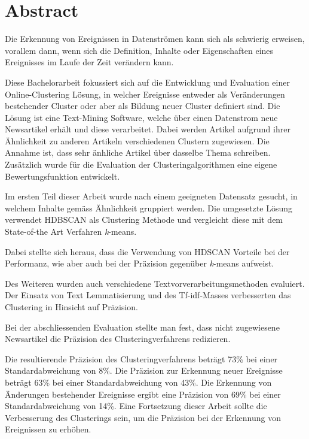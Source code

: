 
\section*{Abstract}

Die Erkennung von Ereignissen in Datenströmen kann sich als schwierig erweisen, vorallem dann,
wenn sich die Definition, Inhalte oder Eigenschaften eines Ereignisses im Laufe der Zeit verändern kann.

Diese Bachelorarbeit fokussiert sich auf die Entwicklung und Evaluation einer Online-Clustering Lösung,
in welcher Ereignisse entweder als Veränderungen bestehender Cluster oder aber als Bildung neuer Cluster
definiert sind.
Die Lösung ist eine Text-Mining Software, welche über einen Datenstrom neue Newsartikel erhält
und diese verarbeitet.
Dabei werden Artikel aufgrund ihrer Ähnlichkeit zu anderen Artikeln verschiedenen Clustern zugewiesen.
Die Annahme ist, dass sehr änhliche Artikel über dasselbe Thema schreiben.
Zusätzlich wurde für die Evaluation der Clusteringalgorithmen eine eigene Bewertungsfunktion entwickelt.

Im ersten Teil dieser Arbeit wurde nach einem geeigneten Datensatz gesucht,
in welchem Inhalte gemäss Ähnlichkeit gruppiert werden.
Die umgesetzte Lösung verwendet HDBSCAN als Clustering Methode und vergleicht diese
mit dem State-of-the Art Verfahren \textit{k}-means.

Dabei stellte sich heraus, dass die Verwendung von HDSCAN Vorteile bei der Performanz,
wie aber auch bei der Präzision gegenüber \textit{k}-means aufweist.

Des Weiteren wurden auch verschiedene Textvorverarbeitungsmethoden evaluiert.
Der Einsatz von Text Lemmatisierung und des Tf-idf-Masses verbesserten
das Clustering in Hinsicht auf Präzision.

Bei der abschliessenden Evaluation stellte man fest,
dass nicht zugewiesene Newsartikel die Präzision des Clusteringverfahrens redizieren.

Die resultierende Präzision des Clusteringverfahrens beträgt 73\% bei einer Standardabweichung von 8\%.
Die Präzision zur Erkennung neuer Ereignisse beträgt 63\% bei einer Standardabweichung von 43\%.
Die Erkennung von Änderungen bestehender Ereignisse ergibt eine
Präzision von 69\% bei einer Standardabweichung von 14\%.
Eine Fortsetzung dieser Arbeit sollte die Verbesserung des Clusterings sein,
um die Präzision bei der Erkennung von Ereignissen zu erhöhen.
